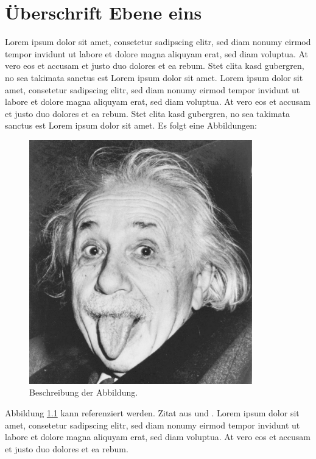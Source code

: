 \documentclass[a4paper, 11pt, toc=listof, toc=bib]{scrbook}
\begin{document}
\frontmatter %

\ofoot*{}\ifoot*{}\cfoot*{}
\tableofcontents

\mainmatter %

\chapter{Überschrift Ebene eins}

Lorem ipsum dolor sit amet, consetetur sadipscing elitr, sed diam nonumy eirmod tempor invidunt ut labore et dolore magna aliquyam erat, sed diam voluptua. At vero eos et accusam et justo duo dolores et ea rebum. Stet clita kasd gubergren, no sea takimata sanctus est Lorem ipsum dolor sit amet. Lorem ipsum dolor sit amet, consetetur sadipscing elitr, sed diam nonumy eirmod tempor invidunt ut labore et dolore magna aliquyam erat, sed diam voluptua. At vero eos et accusam et justo duo dolores et ea rebum. Stet clita kasd gubergren, no sea takimata sanctus est Lorem ipsum dolor sit amet.
Es folgt eine Abbildungen:

\begin{figure}[htbp]
\centering
\includegraphics[scale=0.5]{einstein}
\caption{Beschreibung der Abbildung.}
\label{abb_einstein}
\end{figure}

Abbildung \ref{abb_einstein} kann referenziert werden. Zitat aus \cite{scheme} und \cite[17]{knuth}. Lorem ipsum dolor sit amet, consetetur sadipscing elitr, sed diam nonumy eirmod tempor invidunt ut labore et dolore magna aliquyam erat, sed diam voluptua. At vero eos et accusam et justo duo dolores et ea rebum.
\end{document}
